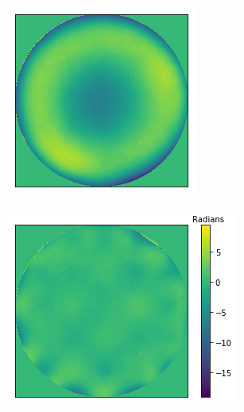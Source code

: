 \begin{figure}[h]
	\centering
	\begin{subfigure}{0.4\textwidth}
		\centering
		\includegraphics[width=1\linewidth, scale=2]{./images/system_wavefront_before_correction_adv.png}
		\caption{}
		\label{fig:aberrated_wavefront_defocus_ptt_rmv_crop_phase_only}
	\end{subfigure}
	\begin{subfigure}{0.49\textwidth}
		\centering
		\vspace{-.25cm}
		\includegraphics[width=1\linewidth, scale=2]{./images/system_wavefront_after_correction_best_20it_adv.png}
		\caption{}
		\label{fig:flattened_wavefront_20it}
	\end{subfigure}
	

\end{figure}
